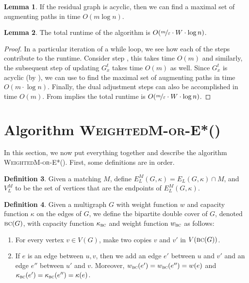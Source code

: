 \documentclass[a4paper,11pt]{article}
\newcommand{\eps}{\varepsilon}
\theoremstyle{definition}
\newtheorem{definition2}{Definition}
\theoremstyle{definition}
\theoremstyle{definition}
\theoremstyle{definition}
\theoremstyle{definition}
\newtheorem{lemma2}[definition2]{Lemma}
\theoremstyle{definition}
\theoremstyle{definition}
\theoremstyle{definition}
\theoremstyle{definition}
\theoremstyle{definition}
\theoremstyle{definition}
\theoremstyle{definition}
\theoremstyle{definition}
\theoremstyle{definition}
\theoremstyle{definition}
\begin{document}
\begin{lemma2}\cite{SleatorT83}\label{lem:findingaugpaths}
If the residual graph is acyclic, then we can find a maximal set of augmenting paths in time $O(m\log n)$.
\end{lemma2}

\begin{lemma2}
The total runtime of the algorithm is $O(\nicefrac{m}{\eps}\cdot W\cdot \log n)$.
\end{lemma2}
\begin{proof}
    In a particular iteration of a while loop, we see how each of the steps contribute to the runtime. Consider step , this takes time $O(m)$ and similarly, the subsequent step of updating $G^t_x$ 
    takes time $O(m)$ as well. Since $G^t_x$ is acyclic (by ), we can use  to find the maximal set of augmenting paths in time $O(m\cdot \log n)$. Finally, the dual adjustment steps can also be accomplished in time $O(m)$. From  implies the total runtime is $O(\nicefrac{m}{\eps}\cdot W\cdot \log n)$.
\end{proof}
 
\section{Algorithm \textsc{WeightedM-or-E*()}}
 
 In this section, we now put everything together and describe the algorithm \textsc{WeightedM-or-E*}(). First, some definitions are in order. 
 
 \begin{definition2}\label{def:lowcapedges}
 Given a matching $M$, define $E^{M}_{L}(G,\kappa)=E_{L}(G,\kappa)\cap M$, and $V^{M}_{L}$ to be the set of vertices that are the endpoints of $E^{M}_{L}(G,\kappa)$. 
 \end{definition2}

\begin{definition2}
    Given a multigraph $G$ with weight function $w$ and capacity function $\kappa$ on the edges of $G$, we define the bipartite double cover of $G$, denoted $\textsc{bc}(G)$, with capacity function $\kappa_{\textsc{bc}}$ and weight function $w_{\textsc{bc}}$ as follows:
    \begin{enumerate}
        \item For every vertex $v\in V(G)$, make two copies $v$ and $v'$ in $V(\textsc{bc}(G))$. 
        \item If $e$ is an edge between $u,v$, then we add an edge $e'$ between $u$ and $v'$ and an edge $e''$ between $u'$ and $v$. Moreover, $w_{\textsc{bc}}(e')=w_{\textsc{bc}}(e'')=w(e)$ and $\kappa_{\textsc{bc}}(e')=\kappa_{\textsc{bc}}(e'')=\kappa(e)$.
    \end{enumerate}
\end{definition2}
\end{document}
